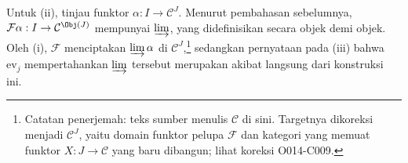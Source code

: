 \begin{bukti}
	Untuk (ii), tinjau funktor $\alpha: I \to \mathcal{C}^J$. Menurut
	pembahasan sebelumnya, $\mathcal{F}\alpha: I \to \mathcal{C}^{\Obj(J)}$
	mempunyai $\varinjlim$, yang didefinisikan secara objek demi objek. Oleh (i),
	$\mathcal{F}$ menciptakan $\varinjlim \alpha$ di $\mathcal{C}^J$,\footnote{Catatan
	penerjemah: teks sumber menulis $\mathcal{C}$ di sini. Targetnya dikoreksi
	menjadi $\mathcal{C}^J$, yaitu domain funktor pelupa $\mathcal{F}$ dan
	kategori yang memuat funktor $X: J \to \mathcal{C}$ yang baru dibangun;
	lihat koreksi O014-C009.}
	sedangkan pernyataan
	pada (iii) bahwa $\mathrm{ev}_j$ mempertahankan $\varinjlim$ tersebut
	merupakan akibat langsung dari konstruksi ini.
\end{bukti}
